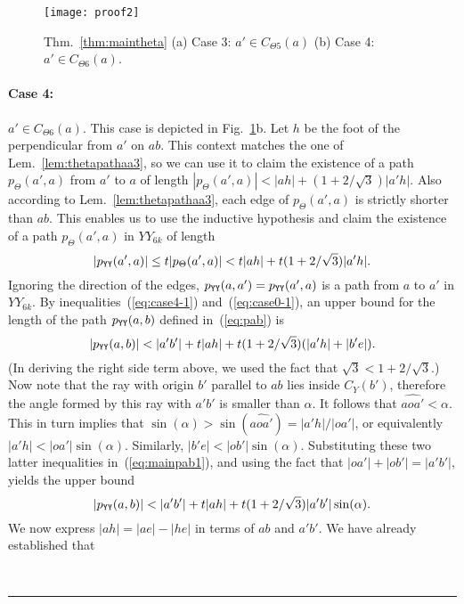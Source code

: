 \documentclass[11pt]{article}
\newcommand\cone{{C}}
\newcommand\pyy{p_{{\tt YY}}}
\newcommand\ang[1]{\widehat{#1}}
\newcommand{\qed}{\rule{0.5em}{1.5ex}}
\newcommand{\fqed}{{\hfill~\qed}}
\newenvironment{proof}{{\noindent \bf Proof.}}
                      {{\hfill \fqed} \vspace{1em}}
\begin{document}
\begin{proof}
\begin{figure}[htpb]
\centering
\texttt{[image: proof2]}
\caption{Thm.~\ref{thm:maintheta} (a) Case 3: $a' \in \cone_{\Theta5}(a)$ (b) Case 4: $a' \in \cone_{\Theta6}(a)$.}
\label{fig:proof2}
\end{figure}


\paragraph{Case 4:} $a' \in \cone_{\Theta6}(a)$. This case is depicted in Fig.~\ref{fig:proof2}b.
Let $h$ be the foot of the perpendicular from $a'$ on $ab$. This context matches the one of Lem.~\ref{lem:thetapathaa3}, so we can use it to claim the existence of a path $p_\Theta(a',a)$ from $a'$ to $a$ of length $|p_\Theta(a',a)| < |ah| + (1+2/\sqrt{3})|a'h|$. Also according to Lem.~\ref{lem:thetapathaa3}, each edge of $p_\Theta(a',a)$ is strictly shorter than $ab$. This enables us to use the inductive hypothesis and claim the existence of a path $p_\Theta(a',a)$ in $YY_{6k}$ of length
\begin{equation}
|\pyy(a',a)| \le t|p_\Theta(a',a)| < t|ah| + t(1+2/\sqrt{3})|a'h|.
\label{eq:case4-1}
\end{equation}
Ignoring the direction of the edges, $\pyy(a, a') = \pyy(a', a)$ is a path from $a$ to $a'$ in $YY_{6k}$. By inequalities~(\ref{eq:case4-1}) and~(\ref{eq:case0-1}), an upper bound for the length of the path $\pyy(a, b)$ defined in~(\ref{eq:pab}) is
\begin{equation}
|\pyy(a,b)| < |a'b'| + t|ah| + t(1+2/\sqrt{3})(|a'h|+|b'e|).
\label{eq:mainpab1}
\end{equation}
(In deriving the right side term above, we used the fact that $\sqrt{3} < 1+2/\sqrt{3}$.)
Now note that the ray with origin $b'$ parallel to $ab$ lies inside $C_Y(b')$, therefore the angle formed by this ray with $a'b'$ is smaller than $\alpha$. It follows that $\ang{aoa'} < \alpha$. This in turn implies that
$\sin(\alpha) > \sin(\ang{aoa'}) = |a'h|/|oa'|$, or equivalently $|a'h| < |oa'|\sin(\alpha)$. Similarly,
$|b'e| < |ob'|\sin(\alpha)$. Substituting these two latter inequalities in~(\ref{eq:mainpab1}), and using
the fact that $|oa'| + |ob'| = |a'b'|$, yields the upper bound
\begin{equation}
|\pyy(a,b)| < |a'b'| + t|ah| + t(1+2/\sqrt{3})|a'b'|\sin(\alpha).
\label{eq:mainpab2}
\end{equation}
We now express $|ah| = |ae| - |he|$ in terms of $ab$ and $a'b'$. We have already established that

\end{proof}
\end{document}

